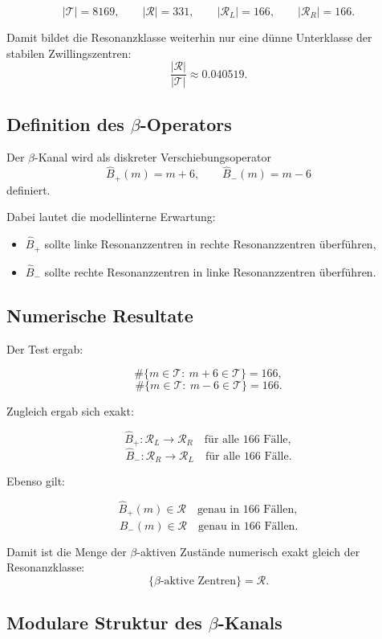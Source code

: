 \documentclass[11pt,a4paper]{article}
\theoremstyle{definition}
\theoremstyle{plain}
\theoremstyle{remark}
\begin{document}
	\[
	|\mathcal T| = 8169,
	\qquad
	|\mathcal R| = 331,
	\qquad
	|\mathcal R_L| = 166,
	\qquad
	|\mathcal R_R| = 166.
	\]
	
	Damit bildet die Resonanzklasse weiterhin nur eine dünne Unterklasse der stabilen Zwillingszentren:
	\[
	\frac{|\mathcal R|}{|\mathcal T|}
	\approx 0.040519.
	\]
	
	\subsection{Definition des \texorpdfstring{$\beta$}{beta}-Operators}
	
	Der \(\beta\)-Kanal wird als diskreter Verschiebungsoperator
	\[
	\hat B_+(m)=m+6,
	\qquad
	\hat B_-(m)=m-6
	\]
	definiert.
	
	Dabei lautet die modellinterne Erwartung:
	
	\begin{itemize}
		\item \(\hat B_+\) sollte linke Resonanzzentren in rechte Resonanzzentren überführen,
		\item \(\hat B_-\) sollte rechte Resonanzzentren in linke Resonanzzentren überführen.
	\end{itemize}
	
	\subsection{Numerische Resultate}
	
	Der Test ergab:
	
	\[
	\#\{m\in\mathcal T:\ m+6\in\mathcal T\} = 166,
	\]
	\[
	\#\{m\in\mathcal T:\ m-6\in\mathcal T\} = 166.
	\]
	
	Zugleich ergab sich exakt:
	
	\[
	\hat B_+:\mathcal R_L\to\mathcal R_R \quad \text{für alle } 166 \text{ Fälle},
	\]
	\[
	\hat B_-:\mathcal R_R\to\mathcal R_L \quad \text{für alle } 166 \text{ Fälle}.
	\]
	
	Ebenso gilt:
	
	\[
	\hat B_+(m)\in\mathcal R \quad \text{genau in } 166 \text{ Fällen},
	\]
	\[
	\hat B_-(m)\in\mathcal R \quad \text{genau in } 166 \text{ Fällen}.
	\]
	
	Damit ist die Menge der \(\beta\)-aktiven Zustände numerisch exakt gleich der Resonanzklasse:
	\[
	\{\text{\(\beta\)-aktive Zentren}\} = \mathcal R.
	\]
	
	\subsection{Modulare Struktur des \texorpdfstring{$\beta$}{beta}-Kanals}
	
\end{document}
